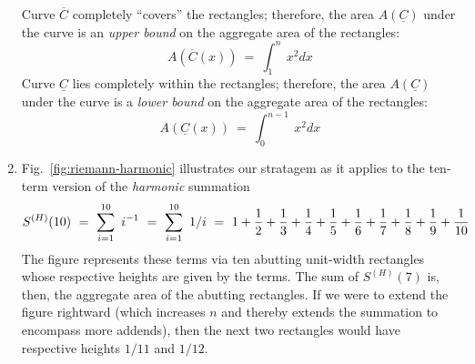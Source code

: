 \begin{enumerate}
\begin{figure}[htb]
\label{fig:riemann-n2}
\end{figure}
Curve $\overline{C}$ completely ``covers'' the rectangles; therefore, the area $A(\underline{C})$ under the curve is an {\em upper bound} on the aggregate area of the rectangles:
\[ A(\overline{C}(x)) \ = \ \int_1^n \ x^2 dx \]
Curve $\underline{C}$ lies completely within the rectangles; therefore, the area $A(\underline{C})$ under the curve is a {\em lower bound} on the aggregate area of the rectangles:
\[ A(\underline{C}(x)) \ = \  \int_0^{n-1}  \ x^2 dx \]

\medskip\item
Fig.~\ref{fig:riemann-harmonic} illustrates our stratagem as it applies to the ten-term version of the {\em harmonic} summation 
\[ S^{(H)}(10) \ = \ \sum_{i=1}^{10} \ i^{-1} \ = \ \sum_{i=1}^{10} \ 1/i 
  \ = \
1 +  {1 \over 2} + {1 \over 3}  + {1 \over 4}  + {1 \over 5} + {1 \over 6} + {1 \over 7} + {1 \over 8}  + {1 \over 9}  + {1 \over 10} 
\]
The figure represents these terms via ten abutting unit-width rectangles whose respective heights are given by the terms.  The sum of $S^{(H)}(7)$ is, then, the aggregate area of the abutting rectangles.  If we were to extend the figure rightward (which increases $n$ and thereby extends the summation to encompass more addends), then the next two rectangles would have respective heights $1/11$ and $1/12$.

\smallskip


\end{enumerate}
